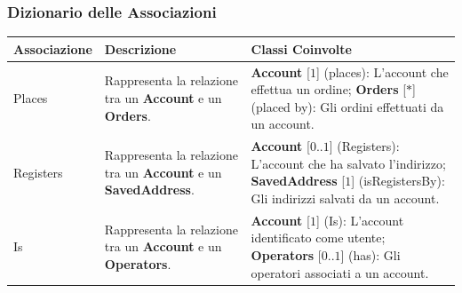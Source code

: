 \subsubsection{Dizionario delle Associazioni}


\begin{tabularx}{\textwidth}{YYY}
  \toprule
  \textbf{Associazione} & \textbf{Descrizione} & \textbf{Classi Coinvolte} \\
  \midrule
  Places &
  \begin{minipage}[c]{\linewidth}
    \vspace{0.5cm}
    Rappresenta la relazione tra un \textbf{Account} e un \textbf{Orders}. \newline
  \end{minipage} &
  \begin{minipage}[c]{\linewidth}
    \vspace{0.5cm}
    \textbf{Account} [\(1\)] (places): L'account che effettua un ordine; \newline
    \textbf{Orders} [\(*\)] (placed by): Gli ordini effettuati da un account. \newline
  \end{minipage} \\

  Registers &
  \begin{minipage}[c]{\linewidth}
    \vspace{0.5cm}
    Rappresenta la relazione tra un \textbf{Account} e un \textbf{SavedAddress}. \newline
  \end{minipage} &
  \begin{minipage}[c]{\linewidth}
    \vspace{0.5cm}
    \textbf{Account} [\(0..1\)] (Registers):  L'account che ha salvato l'indirizzo; \newline
    \textbf{SavedAddress} [\(1\)] (isRegistersBy): Gli indirizzi salvati da un account. \newline
  \end{minipage} \\

  Is &
  \begin{minipage}[c]{\linewidth}
    \vspace{0.5cm}
    Rappresenta la relazione tra un \textbf{Account} e un \textbf{Operators}. \newline
  \end{minipage} &
  \begin{minipage}[c]{\linewidth}
    \vspace{0.5cm}
    \textbf{Account} [\(1\)] (Is): L'account identificato come utente; \newline
    \textbf{Operators} [\(0..1\)] (has): Gli operatori associati a un account. \newline
  \end{minipage} \\


\end{tabularx}
